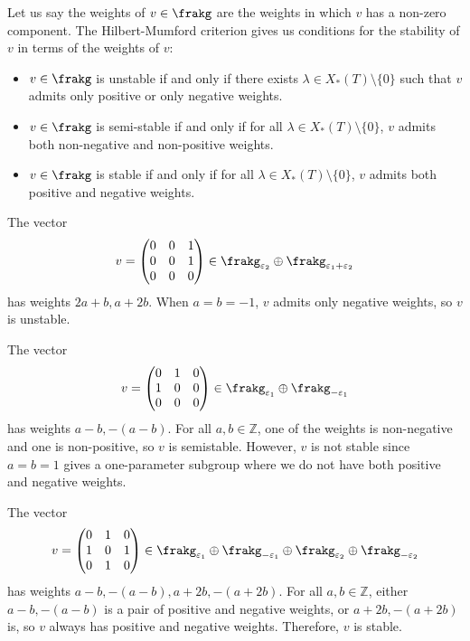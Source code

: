 Let us say the weights of $v \in \frakg$ are the weights in which $v$ has a non-zero component.
The Hilbert-Mumford criterion gives us conditions for the stability of $v$ in terms of the weights of $v$:
\begin{itemize}[label=-]
\item
$v \in \frakg$ is unstable if and only if there exists $\lambda \in X_*(T)\setminus\{0\}$ such that $v$ admits only positive or only negative weights.

\item
$v \in \frakg$ is semi-stable if and only if for all $\lambda \in X_*(T)\setminus\{0\}$, $v$ admits both non-negative and non-positive weights.

\item
$v \in \frakg$ is stable if and only if for all $\lambda \in X_*(T)\setminus\{0\}$, $v$ admits both positive and negative weights.
\end{itemize}

\begin{example}
The vector 
$$v = \begin{pmatrix} 0 & 0 & 1 \\ 0 & 0 & 1 \\ 0 & 0 & 0 \end{pmatrix} \in \frakg_{\varepsilon_2} \oplus \frakg_{\varepsilon_1 + \varepsilon_2}$$
has weights $2a + b, a + 2b$.
When $a = b = -1$, $v$ admits only negative weights, so $v$ is unstable.

The vector 
$$v = \begin{pmatrix} 0 & 1 & 0 \\ 1 & 0 & 0 \\ 0 & 0 & 0 \end{pmatrix} \in \frakg_{\varepsilon_1} \oplus \frakg_{-\varepsilon_1}$$
has weights $a-b, - (a-b)$.
For all $a, b \in \mathbb{Z}$, one of the weights is non-negative and one is non-positive, so $v$ is semistable.
However, $v$ is not stable since $a=b=1$ gives a one-parameter subgroup where we do not have both positive and negative weights.

The vector 
$$v = \begin{pmatrix} 0 & 1 & 0 \\ 1 & 0 & 1 \\ 0 & 1 & 0 \end{pmatrix} \in  \frakg_{\varepsilon_1} \oplus \frakg_{-\varepsilon_1} \oplus  \frakg_{\varepsilon_2} \oplus \frakg_{-\varepsilon_2}$$
has weights $a-b, -(a-b), a+2b, -(a+2b)$.
For all $a, b \in \mathbb{Z}$, either $a-b, -(a-b)$ is a pair of positive and negative weights, or $a+2b, -(a+2b)$ is, so $v$ always has positive and negative weights.
Therefore, $v$ is stable.
\end{example}

